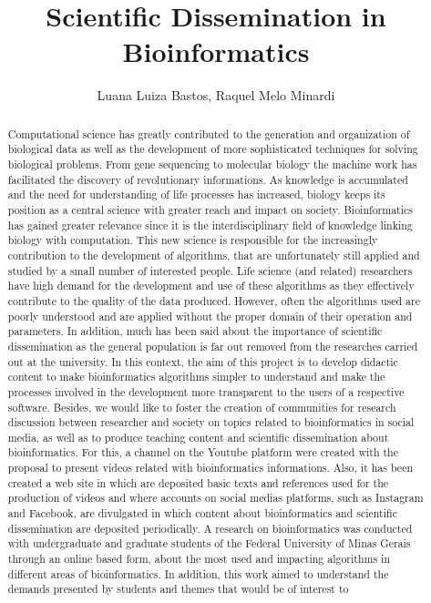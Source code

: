 \documentclass[twoside]{article}
\title{\vspace{-15mm}\fontsize{24pt}{10pt}\selectfont\textbf{ Scientific Dissemination in Bioinformatics }} %
\author{ Luana Luiza Bastos, Raquel Melo Minardi }
\affil{ Universidade Federal de Minas Gerais - UFMG }
\date{}
\begin{document}
  
  
  \maketitle %
  
  
  \thispagestyle{fancy} %
  
  
  \begin{abstract}
  Computational science has greatly contributed to the generation and organization of biological data as well as the development of more sophisticated techniques for solving biological problems. From gene sequencing to molecular biology the machine work has facilitated the discovery of revolutionary informations. As knowledge is accumulated and the need for understanding of life processes has increased,  biology keeps its position as a central science with greater reach and impact on society. Bioinformatics has gained greater relevance since it is the interdisciplinary field of knowledge linking biology with computation. This new science is responsible for the increasingly contribution to the development of algorithms,  that are unfortunately still applied and studied by a small number of interested people. Life science (and related) researchers have high demand for the development and use of these algorithms as they effectively contribute to the quality of the data produced. However,  often the algorithms used are poorly understood and are applied without the proper domain of their operation and parameters. In addition,  much has been said about the importance of scientific dissemination as the general population is far out removed from the researches carried out at the university. In this context,  the aim of this project is to develop didactic content to make bioinformatics algorithms simpler to understand and make the processes involved in the development more transparent to the users of a respective software. Besides,  we would like to foster the creation of communities for research discussion between researcher and society on topics related to bioinformatics in social media,  as well as to produce teaching content and scientific dissemination about bioinformatics. For this,  a channel on the Youtube platform were created with the proposal to present videos related with bioinformatics informations. Also,  it has been created a web site in which are deposited basic texts and references used for the production of videos and where accounts on social medias platforms,  such as Instagram and Facebook,  are divulgated in which content about bioinformatics and scientific dissemination are deposited periodically. A research on bioinformatics was conducted with undergraduate and graduate students of the Federal University of Minas Gerais through an online based form,  about the most used and impacting algorithms in different areas of bioinformatics. In addition,  this work aimed to understand the demands presented by students and themes that would be of interest to 
\end{abstract}
\end{document}
